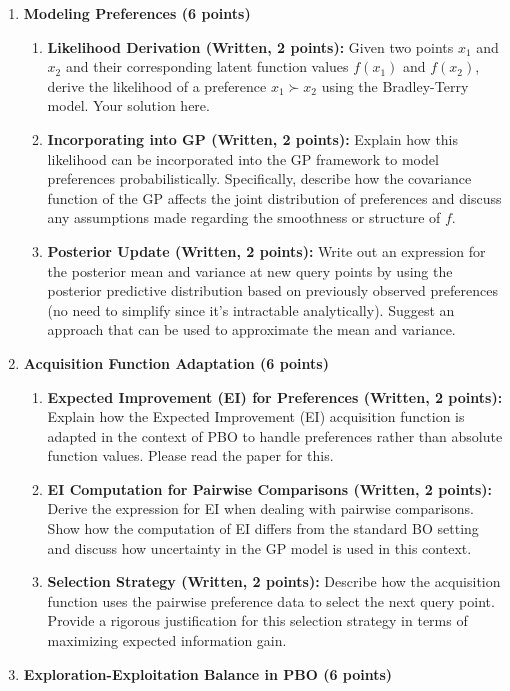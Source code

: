 \documentclass[
  letterpaper,
  numbers=noenddot,
  DIV=11]{scrreprt}
\theoremstyle{plain}
\theoremstyle{definition}
\theoremstyle{plain}
\theoremstyle{remark}
\begin{document}
\begin{enumerate}
\def\labelenumi{(\alph{enumi})}
\item
  \textbf{Modeling Preferences (6 points)}

  \begin{enumerate}
  \def\labelenumii{(\roman{enumii})}
  \item
    \textbf{Likelihood Derivation (Written, 2 points):} Given two points
    \(x_1\) and \(x_2\) and their corresponding latent function values
    \(f(x_1)\) and \(f(x_2)\), derive the likelihood of a preference
    \(x_1 \succ x_2\) using the Bradley-Terry model. Your solution here.
  \item
    \textbf{Incorporating into GP (Written, 2 points):} Explain how this
    likelihood can be incorporated into the GP framework to model
    preferences probabilistically. Specifically, describe how the
    covariance function of the GP affects the joint distribution of
    preferences and discuss any assumptions made regarding the
    smoothness or structure of \(f\).
  \item
    \textbf{Posterior Update (Written, 2 points):} Write out an
    expression for the posterior mean and variance at new query points
    by using the posterior predictive distribution based on previously
    observed preferences (no need to simplify since it's intractable
    analytically). Suggest an approach that can be used to approximate
    the mean and variance.
  \end{enumerate}
\item
  \textbf{Acquisition Function Adaptation (6 points)}

  \begin{enumerate}
  \def\labelenumii{(\roman{enumii})}
  \item
    \textbf{Expected Improvement (EI) for Preferences (Written, 2
    points):} Explain how the Expected Improvement (EI) acquisition
    function is adapted in the context of PBO to handle preferences
    rather than absolute function values. Please read the paper for
    this.
  \item
    \textbf{EI Computation for Pairwise Comparisons (Written, 2
    points):} Derive the expression for EI when dealing with pairwise
    comparisons. Show how the computation of EI differs from the
    standard BO setting and discuss how uncertainty in the GP model is
    used in this context.
  \item
    \textbf{Selection Strategy (Written, 2 points):} Describe how the
    acquisition function uses the pairwise preference data to select the
    next query point. Provide a rigorous justification for this
    selection strategy in terms of maximizing expected information gain.
  \end{enumerate}
\item
  \textbf{Exploration-Exploitation Balance in PBO (6 points)}


\end{enumerate}
\end{document}
